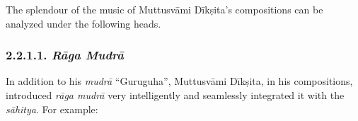 The splendour of the music of Muttusvāmi Dīkṣita’s compositions can be analyzed under the following heads.

\vspace{-.3cm}

\subsubsection*{2.2.1.1. \textit{Rāga Mudrā}}

In addition to his \textit{mudrā} “Guruguha”, Muttusvāmi Dīkṣita, in his compositions, introduced \textit{rāga mudrā} very intelligently and seamlessly integrated it with the \textit{sāhitya}. For example:


